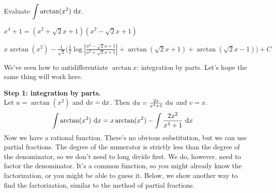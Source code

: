 




\begin{question}
Evaluate $\displaystyle\int\arctan (x^2)~\mathrm{d}x$.
\end{question}
\begin{hint}
$x^4+1 = (x^2+\sqrt2x+1)(x^2-\sqrt2x+1)$
\end{hint}
\begin{answer}
$x\arctan(x^2) -
\frac{1}{\sqrt 2}\Bigg( \frac{1}{2}\log\left|\tfrac{x^2-\sqrt2x+1}{ x^2+\sqrt2x+1}\right|
+\arctan\left(\sqrt{2}x+1\right)+ \arctan\left(\sqrt{2}x-1\right)
\Bigg)+C$
\end{answer}
\begin{solution}
We've seen how to antidifferentiate $\arctan x$: integration by parts. Let's hope the same thing will work here.

\textbf{Step 1: integration by parts.}\\
 Let $u=\arctan(x^2)$ and $\mathrm{d}v = \mathrm{d}x$. Then $\mathrm{d}u = \frac{2x}{x^4+1}~\mathrm{d}u$ and $v=x$.
\begin{align*}
\int\arctan (x^2)~\mathrm{d}x&=x\arctan(x^2) - \int \frac{2x^2}{x^4+1}~\mathrm{d}x
\end{align*}
Now we have a rational function. There's no obvious substitution, but we can use partial fractions. The degree of the numerator is strictly less than the degree of the denominator, so we don't need to long divide first. We do, however, need to factor the denominator. It's a common function, so you might already know the factorization, or you might be able to guess it. Below, we show another way to find the factorization, similar to the method of partial fractions.



\end{solution}
